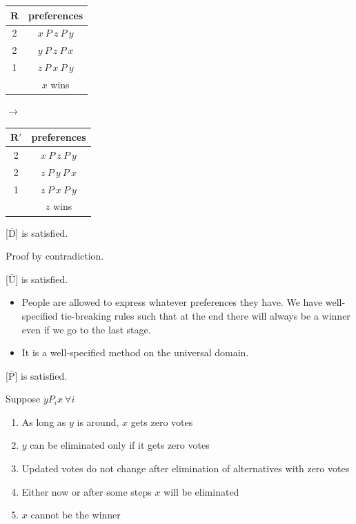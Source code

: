 \documentclass[a4paper]{article}
\begin{document}
\begin{table}[!htbp]
    \centering
    \begin{tabular}{c|c|}
        $\mathbf{R}$ & preferences         \\ 
        \hline
        2  & $x\: P\: z\: P\: y$ \\
        2  & $y\: P\: z\: P\: x$ \\
        1  & $z\: P\: x\: P\: y$ \\
        \hline 
           & $x$ wins
    \end{tabular}
    \qquad $\to$ \qquad
    \centering
    \begin{tabular}{c|c|}
        $\mathbf{R'}$ & preferences         \\ 
        \hline
        2  & $x\: P\: z\: P\: y$ \\
        2  & $z\: P\: y\: P\: x$ \\
        1  & $z\: P\: x\: P\: y$ \\
        \hline 
           & $z$ wins
    \end{tabular}
\end{table}

[$\mathrm{\bar{D}}$] is satisfied.

Proof by contradiction.

[$\mathrm{\bar{U}}$] is satisfied.

\begin{itemize}
    \item People are allowed to express whatever preferences they have. We have well-specified tie-breaking rules such that at the end there will always be a winner even if we go to the last stage.
    \item It is a well-specified method on the universal domain.
\end{itemize}

[$\mathrm{\bar{P}}$] is satisfied.

Suppose $yP_i x\:\forall i$
\begin{enumerate}
    \item As long as $y$ is around, $x$ gets zero votes
    \item $y$ can be eliminated only if it gets zero votes
    \item Updated votes do not change after elimination of alternatives with zero votes
    \item Either now or after some steps $x$ will be eliminated
    \item $x$ cannot be the winner
\end{enumerate}
\end{document}
